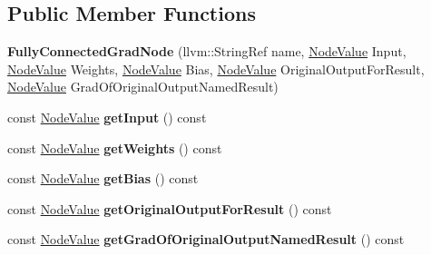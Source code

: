 \subsection*{Public Member Functions}
\begin{DoxyCompactItemize}
\item 
\mbox{\label{classglow_1_1_fully_connected_grad_node_a1776a1613c10e18669c5346ae6a3ca41}} 
{\bfseries Fully\+Connected\+Grad\+Node} (llvm\+::\+String\+Ref name, \hyperlink{structglow_1_1_node_value}{Node\+Value} Input, \hyperlink{structglow_1_1_node_value}{Node\+Value} Weights, \hyperlink{structglow_1_1_node_value}{Node\+Value} Bias, \hyperlink{structglow_1_1_node_value}{Node\+Value} Original\+Output\+For\+Result, \hyperlink{structglow_1_1_node_value}{Node\+Value} Grad\+Of\+Original\+Output\+Named\+Result)
\item 
\mbox{\label{classglow_1_1_fully_connected_grad_node_a5b7a325ee84325b0a7acf722277d2389}} 
const \hyperlink{structglow_1_1_node_value}{Node\+Value} {\bfseries get\+Input} () const
\item 
\mbox{\label{classglow_1_1_fully_connected_grad_node_a36871f10bb392c6334b32e287be40870}} 
const \hyperlink{structglow_1_1_node_value}{Node\+Value} {\bfseries get\+Weights} () const
\item 
\mbox{\label{classglow_1_1_fully_connected_grad_node_a805aa7a390128293ff3248deec6ab540}} 
const \hyperlink{structglow_1_1_node_value}{Node\+Value} {\bfseries get\+Bias} () const
\item 
\mbox{\label{classglow_1_1_fully_connected_grad_node_af1c8cf3e71d17e92465a9d395972fabf}} 
const \hyperlink{structglow_1_1_node_value}{Node\+Value} {\bfseries get\+Original\+Output\+For\+Result} () const
\item 
\mbox{\label{classglow_1_1_fully_connected_grad_node_a39ef881c12ebf34a5bdcd79feccf9fdc}} 
const \hyperlink{structglow_1_1_node_value}{Node\+Value} {\bfseries get\+Grad\+Of\+Original\+Output\+Named\+Result} () const
\item 
\mbox{\label{classglow_1_1_fully_connected_grad_node_a3558bdc5a502a3723813ba7f350ec953}} 

\end{DoxyCompactItemize}
